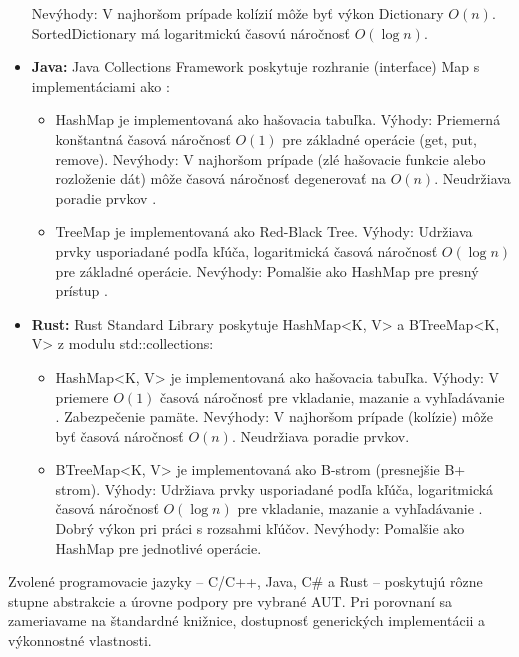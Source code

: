 \documentclass[11pt]{article}
\begin{document}
\begin{itemize}
  Nevýhody: V najhoršom prípade kolízií môže byť výkon Dictionary $O(n)$. SortedDictionary má logaritmickú časovú náročnosť $O(\log n)$.
  \item \textbf{Java:} Java Collections Framework poskytuje rozhranie (interface) Map s implementáciami ako \cite{java_docs}:
  \begin{itemize}
    \item HashMap je implementovaná ako hašovacia tabuľka.
    Výhody: Priemerná konštantná časová náročnosť $O(1)$ pre základné operácie (get, put, remove).
    Nevýhody: V najhoršom prípade (zlé hašovacie funkcie alebo rozloženie dát) môže časová náročnosť degenerovať na $O(n)$. Neudržiava poradie prvkov \cite{java_docs}.
    \item TreeMap je implementovaná ako Red-Black Tree.
    Výhody: Udržiava prvky usporiadané podľa kľúča, logaritmická časová náročnosť $O(\log n)$ pre základné operácie.
    Nevýhody: Pomalšie ako HashMap pre presný prístup \cite{java_docs}.
  \end{itemize}
  \item \textbf{Rust:} Rust Standard Library poskytuje HashMap<K, V> a BTreeMap<K, V> z modulu std::collections:
  \begin{itemize}
    \item HashMap<K, V> je implementovaná ako hašovacia tabuľka.
    Výhody: V priemere $O(1)$ časová náročnosť pre vkladanie, mazanie a vyhľadávanie \cite{rust_collections}. Zabezpečenie pamäte.
    Nevýhody: V najhoršom prípade (kolízie) môže byť časová náročnosť $O(n)$. Neudržiava poradie prvkov.
    \item BTreeMap<K, V> je implementovaná ako B-strom (presnejšie B+ strom).
    Výhody: Udržiava prvky usporiadané podľa kľúča, logaritmická časová náročnosť $O(\log n)$ pre vkladanie, mazanie a vyhľadávanie \cite{rust_collections}. Dobrý výkon pri práci s rozsahmi kľúčov.
    Nevýhody: Pomalšie ako HashMap pre jednotlivé operácie.
  \end{itemize}
\end{itemize}

Zvolené programovacie jazyky -- C/C++, Java, C\# a Rust -- poskytujú rôzne stupne abstrakcie a úrovne podpory pre vybrané AUT. Pri porovnaní sa zameriavame na štandardné knižnice, dostupnosť generických implementácii a výkonnostné vlastnosti.
\end{document}
